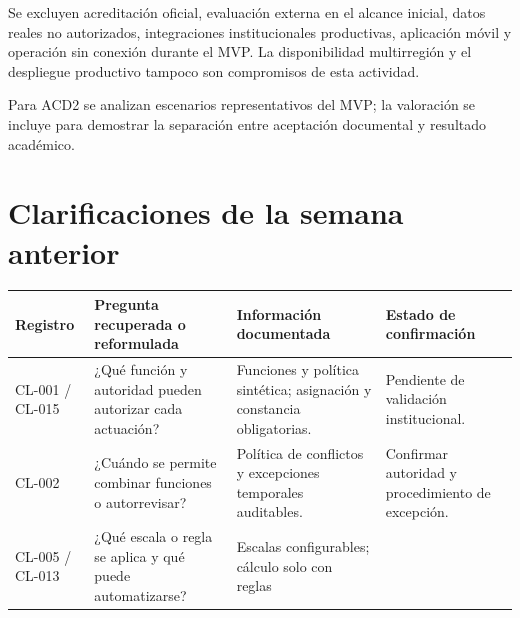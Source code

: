 \documentclass[12pt,a4paper]{report}
\begin{document}
Se excluyen acreditación oficial, evaluación externa en el alcance
inicial, datos reales no autorizados, integraciones institucionales
productivas, aplicación móvil y operación sin conexión durante el MVP.
La disponibilidad multirregión y el despliegue productivo tampoco son
compromisos de esta actividad.

Para ACD2 se analizan escenarios representativos del MVP; la valoración
se incluye para demostrar la separación entre aceptación documental y
resultado académico.

\section{Clarificaciones de la semana
anterior}\label{clarificaciones-de-la-semana-anterior}

{\def\LTcaptype{none} %
\begin{longtable}[]{@{}
  >{\raggedright\arraybackslash}p{}
  >{\raggedright\arraybackslash}p{}
  >{\raggedright\arraybackslash}p{}
  >{\raggedright\arraybackslash}p{}@{}}
\toprule\noalign{}
\begin{minipage}[b]{\linewidth}\raggedright
Registro
\end{minipage} & \begin{minipage}[b]{\linewidth}\raggedright
Pregunta recuperada o reformulada
\end{minipage} & \begin{minipage}[b]{\linewidth}\raggedright
Información documentada
\end{minipage} & \begin{minipage}[b]{\linewidth}\raggedright
Estado de confirmación
\end{minipage} \\
\midrule\noalign{}
\endhead
\bottomrule\noalign{}
\endlastfoot
CL-001 / CL-015 & ¿Qué función y autoridad pueden autorizar cada
actuación? & Funciones y política sintética; asignación y constancia
obligatorias. & Pendiente de validación institucional. \\
CL-002 & ¿Cuándo se permite combinar funciones o autorrevisar? &
Política de conflictos y excepciones temporales auditables. & Confirmar
autoridad y procedimiento de excepción. \\
CL-005 / CL-013 & ¿Qué escala o regla se aplica y qué puede
automatizarse? & Escalas configurables; cálculo solo con reglas

\end{longtable}}
\end{document}
